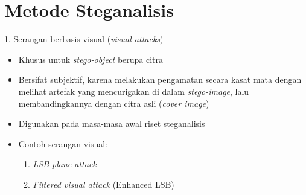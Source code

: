 \documentclass{article}
\begin{document}

\section*{Metode Steganalisis}

1. Serangan berbasis visual (\textit{visual attacks})
\begin{itemize}
    \item Khusus untuk \textit{stego-object} berupa citra
    \item Bersifat subjektif, karena melakukan pengamatan secara kasat mata dengan melihat artefak yang mencurigakan di dalam \textit{stego-image}, lalu membandingkannya dengan citra asli (\textit{cover image})
    \item Digunakan pada masa-masa awal riset steganalisis
    \item Contoh serangan visual:
    \begin{enumerate}
        \item \textit{LSB plane attack}
        \item \textit{Filtered visual attack} (Enhanced LSB)
    \end{enumerate}
\end{itemize}
\end{document}

